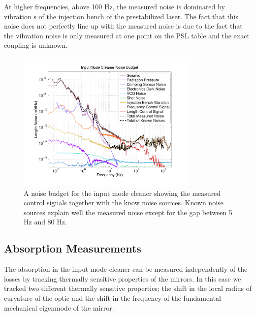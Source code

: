 \documentclass[10pt]{article}
\begin{document}
At higher frequencies, above 100 Hz, the measured noise is dominated by vibration s
of the injection bench of the prestabilized laser.  
The fact that this noise does not perfectly line up with the measured noise is due 
to the fact that the vibration noise is only measured at one point on the PSL table 
and the exact coupling is unknown.  


\begin{figure}[htb]
	\centering
	\includegraphics[width = 0.8\textwidth,trim = 2.5cm 1.5cm 2.5cm 1.5cm]{IMC_Noise_Budget.pdf}
	\caption{A noise budget for the input mode cleaner showing the measured control 
		signals together with the know noise sources.  Known noise sources explain 
		well the measured noise except for the gap between 5 Hz and 80 Hz.}
	\label{fig:NoiseBudget}
\end{figure}

\subsection{Absorption Measurements}
The absorption in the input mode cleaner can be measured independently of the losses 
by tracking thermally sensitive properties of the mirrors.  
In this case we tracked two different thermally sensitive properties; 
the shift in the local radius of curvature of the optic 
and the shift in the frequency of the fundamental mechanical eigenmode of the mirror.  
\end{document}
